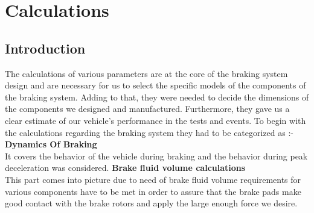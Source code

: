 \chapter{Calculations}

\section{Introduction}
The calculations of various parameters are at the core of the braking system design and are necessary for us to select the specific models of the components of the braking system. Adding to that, they were needed to decide the dimensions of the components we designed and manufactured. Furthermore, they gave us a clear estimate of our vehicle's performance in the tests and events.
To begin with the calculations regarding the braking system they had to be categorized as :-
\textbf{Dynamics Of Braking}\\
It covers the behavior of the vehicle during braking and the behavior during peak deceleration was considered.
\textbf{Brake fluid volume calculations}\\
This part comes into picture due to need of brake fluid volume requirements for various components have to be met in order to assure that the brake pads make good contact with the brake rotors and apply the large enough force we desire.

